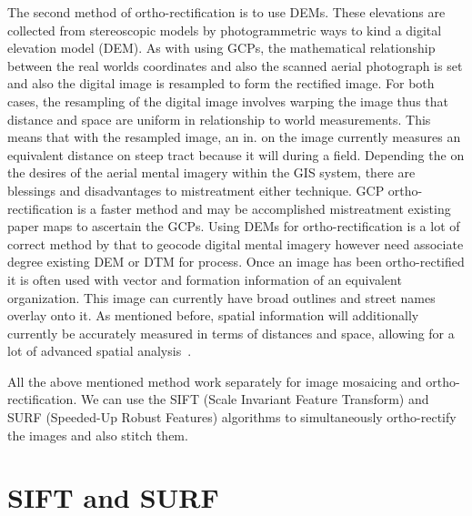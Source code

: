 The second method of ortho-rectification is to use DEMs. These elevations are collected from stereoscopic models by photogrammetric ways to kind a digital elevation model (DEM). As with using GCPs, the mathematical relationship between the real worlds coordinates and also the scanned aerial photograph is set and also the digital image is resampled to form the rectified image. For both cases, the resampling of the digital image involves warping the image thus that distance and space are uniform in relationship to world measurements. This means that with the resampled image, an in. on the image currently measures an equivalent distance on steep tract because it will during a field. Depending the on the desires of the aerial mental imagery within the GIS system, there are blessings and disadvantages to mistreatment either technique. GCP ortho-rectification is a faster method and may be accomplished mistreatment existing paper maps to ascertain the GCPs. Using DEMs for ortho-rectification is a lot of correct method by that to geocode digital mental imagery however need associate degree existing DEM or DTM for process. Once an image has been ortho-rectified it is often used with vector and formation information of an equivalent organization. This image can currently have broad outlines and street names overlay onto it. As mentioned before, spatial information will additionally currently be accurately measured in terms of distances and space, allowing for a lot of advanced spatial analysis~\cite{4}.

All the above mentioned method work separately for image mosaicing and ortho-rectification. We can use the SIFT (Scale Invariant Feature Transform) and SURF (Speeded-Up Robust Features) algorithms to simultaneously ortho-rectify the images and also stitch them. 

\section{SIFT and SURF}

